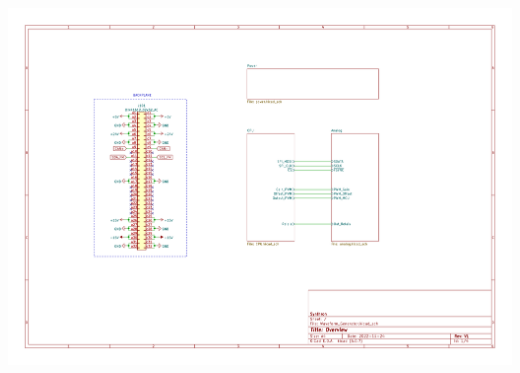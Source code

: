 \documentclass[11pt, a4paper, listof=numbered, captions=tableheading, headinclude, table, xcdraw]{scrreprt}
\begin{document}
\includegraphics[page=4,angle=90,width=\textwidth]{schematics/Waveform_Generator.pdf}

\end{document}
